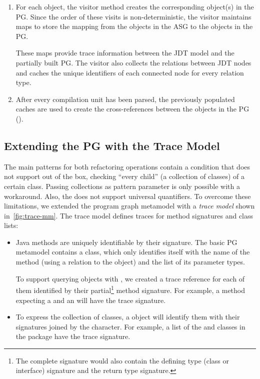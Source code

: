 \documentclass[submission,copyright,creativecommons]{eptcs}
\begin{document}
\begin{enumerate}[noitemsep]
\item For each object, the visitor method creates the corresponding object(s) in the PG. Since the order of these visits is non-deterministic, the visitor maintains maps to store the mapping from the objects in the ASG to the objects in the PG.

These maps provide trace information between the JDT model and the partially built PG. The visitor also collects the relations between JDT nodes and caches the unique identifiers of each connected node for every relation type. 

\item After every compilation unit has been parsed, the previously populated caches are used to create the cross-references between the objects in the PG (\eg {}).
\end{enumerate}

\subsection[Extending the PG with the Trace Model]{Extending the PG with the Trace Model\qquad{}}


\noindent The main patterns for both refactoring operations contain a condition that \eiq does not support out of the box, \eg checking ``every child'' (a collection of classes) of a certain class. Passing collections as pattern parameter is only possible with a workaround. Also, the \iqpl does not support universal quantifiers. To overcome these limitations, we extended the program graph metamodel with a \emph{trace model} shown in~\autoref{fig:trace-mm}. The trace model defines traces for method signatures and class lists:

\begin{itemize}[noitemsep]
\item {} Java methods are uniquely identifiable by their signature. The basic PG metamodel contains a  class, which only identifies itself with the name of the method (using a relation to the  object) and the list of its parameter types.

To support querying  objects with \eiq, we created a trace reference for each of them identified by their partial\footnote{The complete signature would also contain the defining type (class or interface) signature and the return type signature.} method signature. For example, a method  expecting a  and an  will have the  trace signature.
\item {} To express the collection of classes, a  object will identify them with their signatures joined by the \ttctt{\#} character. For example, a list of the  and  classes in the  package have the  trace signature.
\end{itemize}
\end{document}

